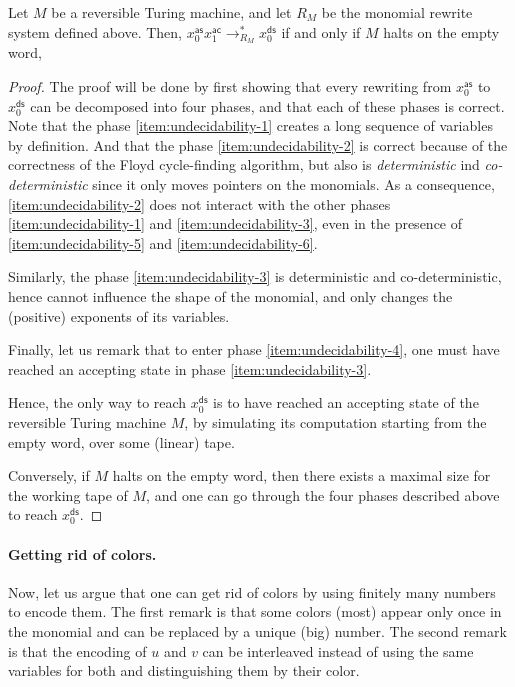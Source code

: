\begin{lemma}
  \label{lem:undecidability}
  Let $M$ be a reversible Turing machine, and let $R_M$ be the monomial rewrite
  system defined above. Then, 
  $x_0^{\mathsf{as}} x_1^{\mathsf{ac}} \to_{R_M}^* x_0^{\mathsf{ds}}$ if and only if
  $M$ halts on the empty word,
\end{lemma}
\begin{proof}

  The proof will be done by first showing that every rewriting from
  $x_0^{\mathsf{as}}$ to $x_0^{\mathsf{ds}}$ can be decomposed into four
  phases, and that each of these phases is correct. Note that the phase
  \ref{item:undecidability-1} creates a long sequence of variables by
  definition. And that the phase \ref{item:undecidability-2} is correct because
  of the correctness of the Floyd cycle-finding algorithm, but also is
  \emph{deterministic} ind \emph{co-deterministic} since it only moves pointers
  on the monomials. As a consequence, \ref{item:undecidability-2} does not
  interact with the other phases \ref{item:undecidability-1} and
  \ref{item:undecidability-3}, even in the presence of
  \ref{item:undecidability-5} and \ref{item:undecidability-6}.

  Similarly, the phase \ref{item:undecidability-3} is deterministic and
  co-deterministic, hence cannot influence the shape of the monomial,
  and only changes the (positive) exponents of its variables.

  Finally, let us remark that to enter phase \ref{item:undecidability-4}, one
  must have reached an accepting state in phase \ref{item:undecidability-3}.

  Hence, the only way to reach $x_0^{\mathsf{ds}}$ is to have reached an accepting
  state of the reversible Turing machine $M$, by simulating its computation
  starting from the empty word, over some (linear) tape.

  Conversely, if $M$ halts on the empty word, then there exists a maximal
  size for the working tape of $M$, and one can go through the four phases
  described above to reach $x_0^{\mathsf{ds}}$.
\end{proof}

\paragraph{Getting rid of colors.}
Now, let us argue that one can get rid of colors by using 
finitely many numbers to encode them. 
The first remark is that some colors (most) appear only once 
in the monomial and can be replaced by a unique (big) number.
The second remark is that the encoding of $u$ and $v$ can be interleaved
instead of using the same variables for both and distinguishing them
by their color. 





